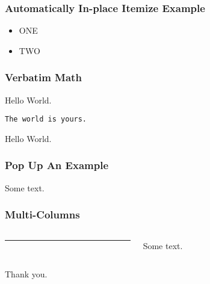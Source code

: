 \documentclass{beamer}
\begin{document}
\begin{frame}
  \frametitle{Automatically In-place Itemize Example}

  \begin{itemize}[<+-| only@+>]
  \item ONE
  \item TWO
  \end{itemize}
\end{frame}

\begin{frame}[fragile]
  \frametitle{Verbatim Math}

  Hello World.
  \begin{lstlisting}
The world is yours.
  \end{lstlisting}
  Hello World.
\end{frame}


\begin{frame}
  \frametitle{Pop Up An Example}
  Some text.
  \pause

\end{frame}

\begin{frame}
  \frametitle{Multi-Columns}
  \begin{columns}[onlytextwidth]
    \begin{column}{0.5\textwidth}
      \centering
      \rule{100pt}{150pt}
    \end{column}
    \begin{column}{0.5\textwidth}
      Some text.
    \end{column}
  \end{columns}
\end{frame}


\begin{frame}[label=thank_you]
  \vspace{-1.5in}
  \begin{mdframed}[style=description]
    {\large Thank you.}
  \end{mdframed}
\end{frame}
\end{document}
